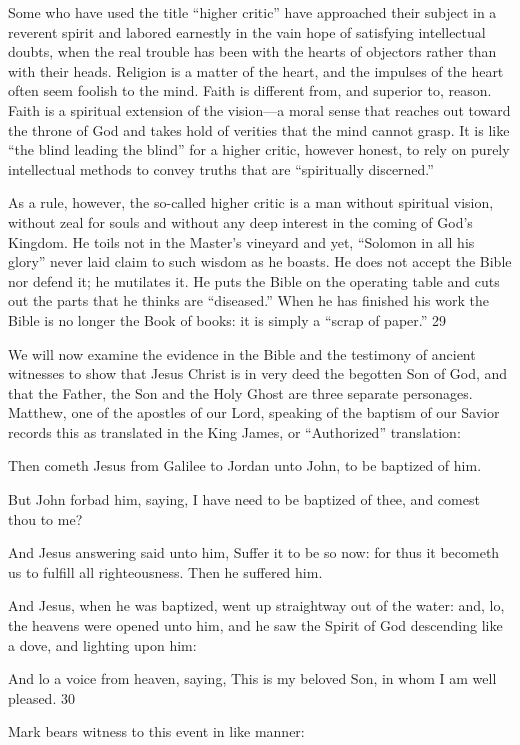 Some who have used the title ``higher critic'' have approached their subject in a reverent spirit
and labored earnestly in the vain hope of satisfying intellectual doubts, when the real trouble
has been with the hearts of objectors rather than with their heads. Religion is a matter of the
heart, and the impulses of the heart often seem foolish to the mind. Faith is different from,
and superior to, reason. Faith is a spiritual extension of the vision—a moral sense that
reaches out toward the throne of God and takes hold of verities that the mind cannot grasp. It
is like ``the blind leading the blind'' for a higher critic, however honest, to rely on purely
intellectual methods to convey truths that are ``spiritually discerned.''

As a rule, however, the so-called higher critic is a man without spiritual vision, without zeal
for souls and without any deep interest in the coming of God's Kingdom. He toils not in the
Master's vineyard and yet, ``Solomon in all his glory'' never laid claim to such wisdom as he
boasts. He does not accept the Bible nor defend it; he mutilates it. He puts the Bible on the
operating table and cuts out the parts that he thinks are ``diseased.'' When he has finished his
work the Bible is no longer the Book of books: it is simply a ``scrap of paper.'' 29

We will now examine the evidence in the Bible and the testimony of ancient witnesses to
show that Jesus Christ is in very deed the begotten Son of God, and that the Father, the Son
and the Holy Ghost are three separate personages. Matthew, one of the apostles of our Lord,
speaking of the baptism of our Savior records this as translated in the King James, or
``Authorized'' translation:

Then cometh Jesus from Galilee to Jordan unto John, to be baptized of him.

But John forbad him, saying, I have need to be baptized of thee, and comest thou to me?

And Jesus answering said unto him, Suffer it to be so now: for thus it becometh us to fulfill
all righteousness. Then he suffered him.

And Jesus, when he was baptized, went up straightway out of the water: and, lo, the heavens
were opened unto him, and he saw the Spirit of God descending like a dove, and lighting
upon him:

And lo a voice from heaven, saying, This is my beloved Son, in whom I am well pleased. 30

Mark bears witness to this event in like manner:

